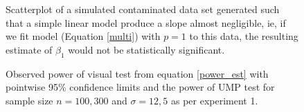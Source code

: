 \documentclass{article}
\begin{document}
\begin{figure}[hbt]
   \centering
       \caption{Scatterplot of a simulated contaminated data set generated such that a simple linear model produce a slope almost negligible, ie, if we fit model (Equation \eqref{multi}) with $p=1$  to this data, the resulting estimate of $\beta_1$ would not be statistically significant.
}
       \label{fig:cont_dat}
\end{figure}


\begin{figure}[hbtp]
   \centering
       \caption{Observed power of visual test from equation \eqref{power_est} with pointwise 95\% confidence limits and the power of UMP test for sample size $n= 100,300$ and $\sigma = 12,5$ as per experiment 1.}
       \label{fig:power_observed}
\end{figure}
\end{document}
